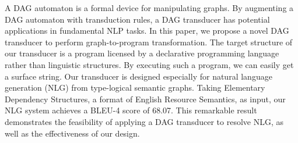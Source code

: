 A DAG automaton is a formal device for manipulating graphs. By augmenting a DAG automaton with transduction rules, a DAG transducer has potential applications in fundamental NLP tasks. In this paper, we propose a novel DAG transducer to perform graph-to-program transformation. The target structure of our transducer is a program licensed by a declarative programming language rather than linguistic structures. By executing such a program, we can easily get a surface string. Our transducer is designed especially for natural language generation (NLG) from type-logical semantic graphs. Taking Elementary Dependency Structures, a format of English Resource Semantics, as input, our NLG system achieves a BLEU-4 score of 68.07. This remarkable result demonstrates the feasibility of applying a DAG transducer to resolve NLG, as well as the effectiveness of our design.
